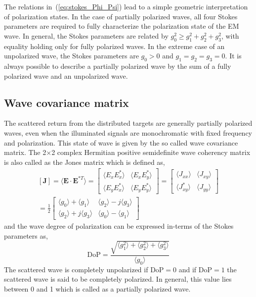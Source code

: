 The relations in~(\ref{eq:stokes_Phi_Psi}) lead to a simple geometric interpretation of polarization states. In the case of partially polarized waves, all four Stokes parameters are required to fully characterize the polarization state of the EM wave. In general, the Stokes parameters are related by $g_0^2 \ge g_1^2+g_2^2+g_3^2$, with equality holding only for fully polarized waves. In the extreme case of an unpolarized wave, the Stokes parameters are $g_0 > 0$ and $g_1=g_2=g_3=0$. It is always possible to describe a partially polarized wave by the sum of a fully polarized wave and an unpolarized wave.
\subsection{Wave covariance matrix}
The scattered return from the distributed targets are generally partially polarized waves, even when the illuminated signals are monochromatic with fixed frequency and polarization. This state of wave is given by the so called wave covariance matrix. The 2$\times$2 complex Hermitian positive semidefinite wave coherency matrix is also called as the Jones matrix which is defined as,   
\begin{equation}
\begin{split}
\mathbf{[J]}= \langle \mathbf{E}\cdot\mathbf{E}^{* T}\rangle=\left[\begin{array}{cc}
\langle E_{x}E^{*}_{x} \rangle & \langle E_{x}E^{*}_{y}\rangle\\
\langle E_{y}E^{*}_{x}\rangle & \langle E_{y}E^{*}_{y}\rangle
\end{array}\right]=\left[\begin{array}{cc}
\langle J_{xx}\rangle & \langle J_{xy}\rangle\\
\langle J_{xy}^*\rangle & \langle J_{yy} \rangle
\end{array}\right] \\
= \frac{1}{2} \left[\begin{array}{cc}
\langle g_0 \rangle + \langle g_1 \rangle & \langle g_2 \rangle -j \langle g_3 \rangle\\
\langle g_2 \rangle +j \langle g_3 \rangle & \langle g_0 \rangle - \langle g_1 \rangle
\end{array}\right]
\end{split}
\end{equation}
and the wave degree of polarization can be expressed in-terms of the Stokes parameters as, 
\begin{equation}
\mbox{DoP}=\frac{\sqrt{\langle g_1^2\rangle+\langle g_2^2\rangle+\langle g_3^2\rangle}}{\langle g_0\rangle}
\end{equation}
The scattered wave is completely unpolarized if $\mbox{DoP}=0$ and if $\mbox{DoP}=1$ the scattered wave is said to be completely polarized. In general, this value lies between 0 and 1 which is called as a partially polarized wave. 

